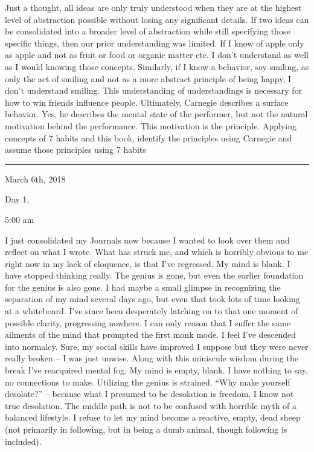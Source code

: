 Just a thought, all ideas are only truly understood when they are at the
highest level of abstraction possible without losing any significant
details. If two ideas can be consolidated into a broader level of
abstraction while still specifying those specific things, then our prior
understanding was limited. If I know of apple only as apple and not as
fruit or food or organic matter etc. I don't understand as well as I
would knowing those concepts. Similarly, if I know a behavior, say
smiling, as only the act of smiling and not as a more abstract principle
of being happy, I don't understand smiling. This understanding of
understandings is necessary for how to win friends influence people.
Ultimately, Carnegie describes a surface behavior. Yes, he describes the
mental state of the performer, but not the natural motivation behind the
performance. This motivation is the principle. Applying concepts of 7
habits and this book, identify the principles using Carnegie and assume
those principles using 7 habits

\begin{center}\rule{0.5\linewidth}{\linethickness}\end{center}

\bigskip
\bigskip
March 6th, 2018

Day 1,

5:00 am

I just consolidated my Journals now because I wanted to look over them
and reflect on what I wrote. What has struck me, and which is horribly
obvious to me right now in my lack of eloquence, is that I've regressed.
My mind is blank. I have stopped thinking really. The genius is gone,
but even the earlier foundation for the genius is also gone. I had maybe
a small glimpse in recognizing the separation of my mind several days
ago, but even that took lots of time looking at a whiteboard. I've since
been desperately latching on to that one moment of possible clarity,
progressing nowhere. I can only reason that I suffer the same ailments
of the mind that prompted the first monk mode. I feel I've descended
into normalcy. Sure, my social skills have improved I suppose but they
were never really broken -- I was just unwise. Along with this miniscule
wisdom during the break I've reacquired mental fog. My mind is empty,
blank. I have nothing to say, no connections to make. Utilizing the
genius is strained. ``Why make yourself desolate?'' -- because what I
presumed to be desolation is freedom, I know not true desolation. The
middle path is not to be confused with horrible myth of a balanced
lifestyle. I refuse to let my mind become a reactive, empty, dead sheep
(not primarily in following, but in being a dumb animal, though
following is included).

